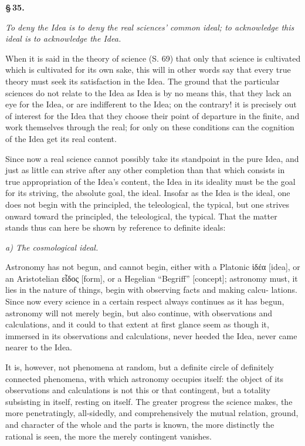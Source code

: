 \documentclass[12pt]{book}
\begin{document}
\begin{center}{\bfseries \S\,35.}\end{center}

\emph{To deny the Idea is to deny the real sciences' common ideal; to acknowledge this ideal is to
acknowledge the Idea.}

When it is said in the theory of science (S. 69) that only that science is cultivated which is cultivated
for its own sake, this will in other words say that every true theory must seek its satisfaction in the
Idea. The ground that the particular sciences do not relate to the Idea as Idea is by no means this, that
they lack an eye for the Idea, or are indifferent to the Idea; on the contrary! it is precisely out of
interest for the Idea that they choose their point of departure in the finite, and work themselves
through the real; for only on these conditions can the cognition of the Idea get its real content.

Since now a real science cannot possibly take its standpoint in the pure Idea, and just as little can
strive after any other completion than that which consists in true appropriation of the Idea's content,
the Idea in its ideality must be the goal for its striving, the absolute goal, the ideal. Insofar as the
Idea is the ideal, one does not begin with the principled, the teleological, the typical, but one strives
onward toward the principled, the teleological, the typical. That the matter stands thus can here be
shown by reference to definite ideals:

\begin{center}\emph{a) The cosmological ideal.}\end{center}

Astronomy has not begun, and cannot begin, either with a Platonic ἰδέα [idea], or an Aristotelian εἶδος
[form], or a Hegelian ``Begriff'' [concept]; astronomy must, it lies in the nature of things, begin with
observing facts and making calcu-
lations. Since now every science in a certain respect always continues as it has begun, astronomy will
not merely begin, but also continue, with observations and calculations, and it could to that extent at
first glance seem as though it, immersed in its observations and calculations, never heeded the Idea,
never came nearer to the Idea.

It is, however, not phenomena at random, but a definite circle of definitely connected phenomena, with
which astronomy occupies itself: the object of its observations and calculations is not this or that
contingent, but a totality subsisting in itself, resting on itself. The greater progress the science
makes, the more penetratingly, all-sidedly, and comprehensively the mutual relation, ground, and
character of the whole and the parts is known, the more distinctly the rational is seen, the more the
merely contingent vanishes.
\end{document}
